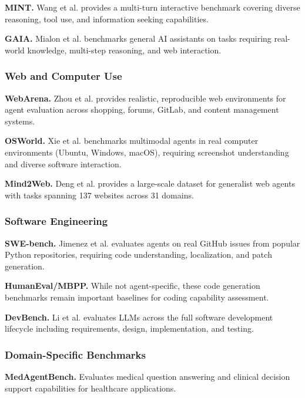 \documentclass{article}
\theoremstyle{plain}
\theoremstyle{definition}
\theoremstyle{remark}
\begin{document}
\textbf{MINT.} Wang et al. \citep{wang2024mint} provides a multi-turn interactive benchmark covering diverse reasoning, tool use, and information seeking capabilities.

\textbf{GAIA.} Mialon et al. \citep{mialon2023gaia} benchmarks general AI assistants on tasks requiring real-world knowledge, multi-step reasoning, and web interaction.

\subsubsection{Web and Computer Use}

\textbf{WebArena.} Zhou et al. \citep{zhou2024webarena} provides realistic, reproducible web environments for agent evaluation across shopping, forums, GitLab, and content management systems.

\textbf{OSWorld.} Xie et al. \citep{xie2024osworld} benchmarks multimodal agents in real computer environments (Ubuntu, Windows, macOS), requiring screenshot understanding and diverse software interaction.

\textbf{Mind2Web.} Deng et al. \citep{deng2023mind2web} provides a large-scale dataset for generalist web agents with tasks spanning 137 websites across 31 domains.

\subsubsection{Software Engineering}

\textbf{SWE-bench.} Jimenez et al. \citep{jimenez2024swebench} evaluates agents on real GitHub issues from popular Python repositories, requiring code understanding, localization, and patch generation.

\textbf{HumanEval/MBPP.} While not agent-specific, these code generation benchmarks \citep{chen2021evaluating, austin2021program} remain important baselines for coding capability assessment.

\textbf{DevBench.} Li et al. \citep{li2024devbench} evaluates LLMs across the full software development lifecycle including requirements, design, implementation, and testing.

\subsubsection{Domain-Specific Benchmarks}

\textbf{MedAgentBench.} Evaluates medical question answering and clinical decision support capabilities for healthcare applications.
\end{document}
